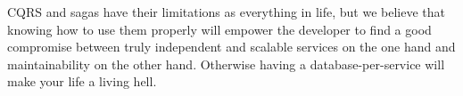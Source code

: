 \documentclass[conference]{IEEEtran}
\begin{document}
CQRS and sagas have their limitations as everything in life, but we believe that knowing how to use them properly will empower the developer to find a good compromise between truly independent and scalable services on the one hand and maintainability on the other hand. Otherwise having a database-per-service will make your life a living hell.








\end{document}
